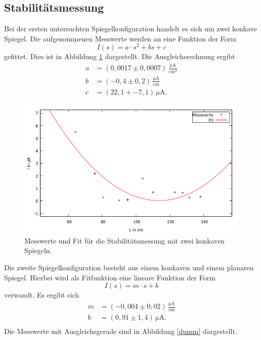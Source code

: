 \subsection{Stabilitätsmessung}
Bei der ersten untersuchten Spiegelkonfiguration handelt es sich um zwei konkave Spiegel. Die aufgenommenen Messwerte werden an eine Funktion der Form
\begin{equation}
  I(s)=a\cdot s^2+bs+c
\end{equation}
gefittet. Dies ist in Abbildung \ref{stabfit1} dargestellt. Die Ausgleichsrechnung ergibt
\begin{align*}
 a &=(0,0017 \pm 0,0007)\, \frac{\si{\micro\ampere}}{\si{\centi\meter}^2}\\
 b &=(-0,4 \pm 0,2)\,  \frac{\si{\micro\ampere}}{\si{\centi\meter}}\\
  c &=(22,1+- 7,1)\,  \si{\micro\ampere}.
\end{align*}
\begin{figure}[H]
  \centering
  \includegraphics[width=14cm]{bilder/konkavkonkav.png}
  \caption{Messwerte und Fit für die Stabilitätsmessung mit zwei konkaven Spiegeln.}
  \label{stabfit1}
\end{figure}
Die zweite Spiegelkonfiguration besteht aus einem konkaven und einem planaren Spiegel. Hierbei wird als Fitfunktion eine lineare Funktion der Form
\begin{equation}
  I(s)=m\cdot s+b
\end{equation}
verwandt. Es ergibt sich
\begin{align*}
  m &=(-0,004 \pm 0,02)\,  \frac{\si{\micro\ampere}}{\si{\centi\meter}}\\
  b &=(0,91 \pm 1,4)\,\si{\micro\ampere}.\\
\end{align*}
Die Messwerte mit Ausgleichsgerade sind in Abbildung \ref{dumm} dargestellt.
